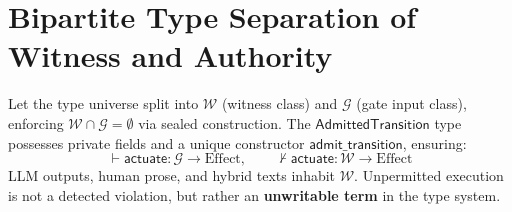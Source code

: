 \section{Bipartite Type Separation of Witness and Authority}

\begin{defn}
Let the type universe split into $\mathcal{W}$ (witness class) and $\mathcal{G}$ (gate input class), enforcing $\mathcal{W} \cap \mathcal{G} = \emptyset$ via sealed construction. The $\mathsf{AdmittedTransition}$ type possesses private fields and a unique constructor $\mathsf{admit\_transition}$, ensuring:
\[
\vdash \mathsf{actuate} : \mathcal{G} \to \mathrm{Effect}, \qquad
\nvdash \mathsf{actuate} : \mathcal{W} \to \mathrm{Effect}
\]
LLM outputs, human prose, and hybrid texts inhabit $\mathcal{W}$. Unpermitted execution is not a detected violation, but rather an \textbf{unwritable term} in the type system.
\end{defn}

